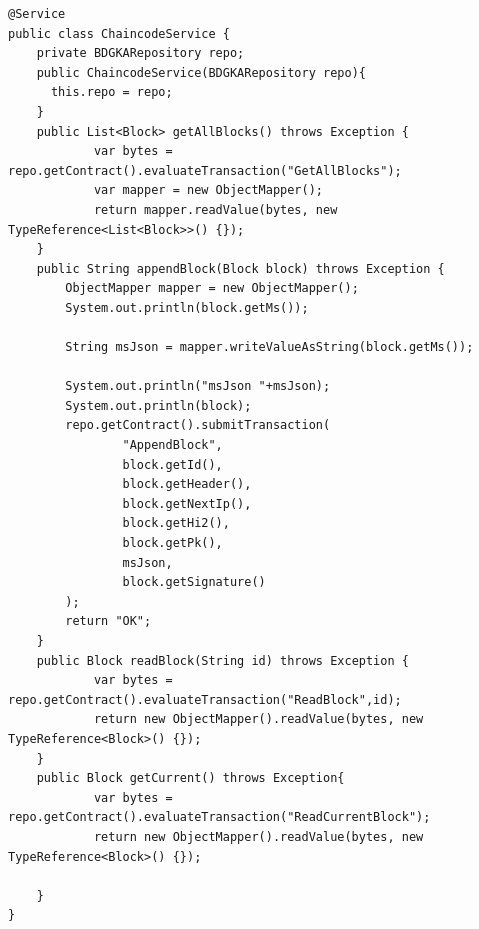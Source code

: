 \documentclass[12pt,a4paper]{report}
\begin{document}
\begin{verbatim}
@Service
public class ChaincodeService {
    private BDGKARepository repo; 
    public ChaincodeService(BDGKARepository repo){
      this.repo = repo;
    }
    public List<Block> getAllBlocks() throws Exception {
            var bytes = repo.getContract().evaluateTransaction("GetAllBlocks");
            var mapper = new ObjectMapper();
            return mapper.readValue(bytes, new TypeReference<List<Block>>() {});
    }
    public String appendBlock(Block block) throws Exception {
        ObjectMapper mapper = new ObjectMapper();
        System.out.println(block.getMs());
        
        String msJson = mapper.writeValueAsString(block.getMs());
        
        System.out.println("msJson "+msJson);
        System.out.println(block);
        repo.getContract().submitTransaction(
                "AppendBlock",
                block.getId(),
                block.getHeader(),
                block.getNextIp(),
                block.getHi2(),
                block.getPk(),
                msJson,
                block.getSignature()
        );
        return "OK";
    }
    public Block readBlock(String id) throws Exception {
            var bytes = repo.getContract().evaluateTransaction("ReadBlock",id);
            return new ObjectMapper().readValue(bytes, new TypeReference<Block>() {});
    }
    public Block getCurrent() throws Exception{
            var bytes = repo.getContract().evaluateTransaction("ReadCurrentBlock");
            return new ObjectMapper().readValue(bytes, new TypeReference<Block>() {});
      
    }
}
\end{verbatim}
\end{document}

